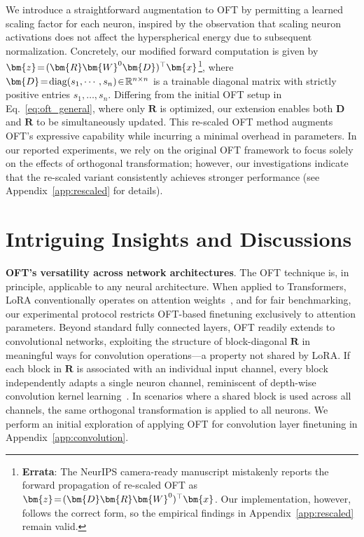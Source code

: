 {We introduce a straightforward augmentation to OFT by permitting a learned scaling factor for each neuron, inspired by the observation that scaling neuron activations does not affect the hyperspherical energy due to subsequent normalization. Concretely, our modified forward computation is given by $\thickmuskip=2mu \medmuskip=2mu\bm{z}=(\bm{R}\bm{W}^0\bm{D})^\top\bm{x}$\footnote{\textbf{Errata}: The NeurIPS camera-ready manuscript mistakenly reports the forward propagation of re-scaled OFT as $\thickmuskip=2mu \medmuskip=2mu\bm{z}=(\bm{D}\bm{R}\bm{W}^0)^\top\bm{x}$. Our implementation, however, follows the correct form, so the empirical findings in Appendix~\ref{app:rescaled} remain valid.}, where $\thickmuskip=2mu \medmuskip=2mu\bm{D}=\text{diag}(s_1,\cdots,s_n)\in\mathbb{R}^{n\times n}$ is a trainable diagonal matrix with strictly positive entries $s_1, \ldots, s_n$. Differing from the initial OFT setup in Eq.~\eqref{eq:oft_general}, where only $\bm{R}$ is optimized, our extension enables both $\bm{D}$ and $\bm{R}$ to be simultaneously updated. This re-scaled OFT method augments OFT's expressive capability while incurring a minimal overhead in parameters. In our reported experiments, we rely on the original OFT framework to focus solely on the effects of orthogonal transformation; however, our investigations indicate that the re-scaled variant consistently achieves stronger performance (see Appendix~\ref{app:rescaled} for details).

\section{Intriguing Insights and Discussions}

\textbf{OFT’s versatility across network architectures}. The OFT technique is, in principle, applicable to any neural architecture. When applied to Transformers, LoRA conventionally operates on attention weights~\cite{hulora2022}, and for fair benchmarking, our experimental protocol restricts OFT-based finetuning exclusively to attention parameters. Beyond standard fully connected layers, OFT readily extends to convolutional networks, exploiting the structure of block-diagonal $\bm{R}$ in meaningful ways for convolution operations—a property not shared by LoRA. If each block in $\bm{R}$ is associated with an individual input channel, every block independently adapts a single neuron channel, reminiscent of depth-wise convolution kernel learning~\cite{chollet2017xception}. In scenarios where a shared block is used across all channels, the same orthogonal transformation is applied to all neurons. We perform an initial exploration of applying OFT for convolution layer finetuning in Appendix~\ref{app:convolution}.

}
